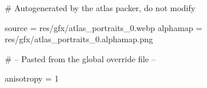 # Autogenerated by the atlas packer, do not modify

source = res/gfx/atlas_portraits_0.webp
alphamap = res/gfx/atlas_portraits_0.alphamap.png

# -- Pasted from the global override file --

anisotropy = 1

